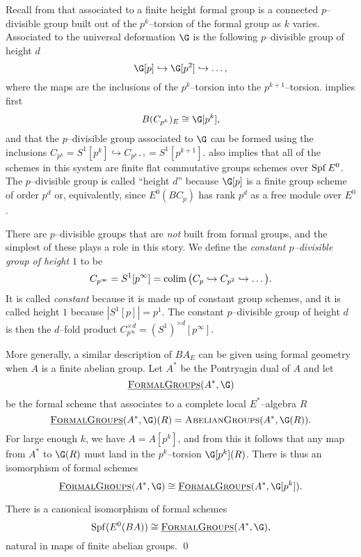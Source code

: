 Recall from  that associated to a finite height formal group is a connected \(p\)--divisible group built out of the \(p^k\)--torsion of the formal group as \(k\) varies. Associated to the universal deformation \(\G\) is the following \(p\)--divisible group of height \(d\)
\[
\G[p] \hookrightarrow \G[p^2] \hookrightarrow \ldots,
\]
where the maps are the inclusions of the \(p^k\)--torsion into the \(p^{k+1}\)--torsion.   implies first 
\[
B(C_{p^k})_{E} \cong \G[p^k],
\]
and that the \(p\)--divisible group associated to \(\G\) can be formed using the inclusions \(C_{p^k} = S^1[p^k] \hookrightarrow C_{p^{k+1}} = S^1[p^{k+1}]\). 
 also implies that all of the schemes in this system are finite flat commutative groups schemes over \(\operatorname{Spf} E^0\). The \(p\)--divisible group is called ``height \(d\)'' because \(\G[p]\) is a finite group scheme of order \(p^d\) or, equivalently, since \(E^0(BC_p)\) has rank \(p^d\) as a free module over \(E^0\).

There are \(p\)--divisible groups that are \emph{not} built from formal groups, and the simplest of these plays a role in this story. We define the \textit{constant \(p\)--divisible group of height \(1\)} to be 
\[
C_{p^{\infty}} = S^1[p^\infty] = \operatorname*{colim} \big ( C_p \hookrightarrow C_{p^2} \hookrightarrow \ldots \big ).
\]
It is called \textit{constant} because it is made up of constant group schemes, and it is called height \(1\) because \(|S^1[p]| = p^1\).  The constant \(p\)--divisible group of height \(d\) is then the \(d\)--fold product \(C_{p^\infty}^{\times d} = (S^1)^{\times d}[p^\infty]\).

More generally, a similar description of \(BA_{E}\) can be given using formal geometry when \(A\) is a finite abelian group. Let \(A^*\) be the Pontryagin dual of \(A\) and let
\[
\InternalHom{FormalGroups}(A^*, \G)
\]
be the formal scheme that associates to a complete local \(E^*\)--algebra \(R\)
\[
\InternalHom{FormalGroups}(A^*, \G)(R) = \CatOf{AbelianGroups}(A^*, \G(R)).
\]
For large enough \(k\), we have \(A = A[p^k]\), and from this it follows that any map from \(A^*\) to \(\G(R)\) must land in the \(p^k\)--torsion \(\G[p^k](R)\).  There is thus an isomorphism of formal schemes
\[
\InternalHom{FormalGroups}(A^*, \G) \cong \InternalHom{FormalGroups}(A^*, \G[p^k]).
\]
\begin{proposition} \label{app:abeliangroupdualhom}
There is a canonical isomorphism of formal schemes
\[
\Spf(E^0(BA)) \cong \InternalHom{FormalGroups}(A^*, \G),
\]
natural in maps of finite abelian groups. \qed
\end{proposition}


